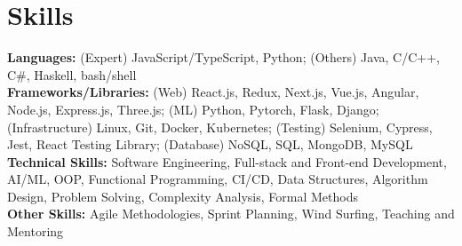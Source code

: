\documentclass[letterpaper,11pt]{article}
\begin{document}
\section{Skills}
 \begin{itemize}[leftmargin=0.15in, label={}]
    \small{
    \item
    \textbf{Languages: }{(Expert) JavaScript/TypeScript, Python; (Others) Java, C/C++, C\#, Haskell, bash/shell}\\
    \textbf{Frameworks/Libraries: }{(Web) React.js, Redux, Next.js, Vue.js, Angular, Node.js, Express.js, Three.js; (ML) Python, Pytorch, Flask, Django; (Infrastructure) Linux, Git, Docker, Kubernetes; (Testing) Selenium, Cypress, Jest, React Testing Library; (Database) NoSQL, SQL, MongoDB, MySQL}\\
    \textbf{Technical Skills: }{Software Engineering, Full-stack and Front-end Development, AI/ML, OOP, Functional Programming, CI/CD, Data Structures, Algorithm Design, Problem Solving, Complexity Analysis, Formal Methods}\\
    \textbf{Other Skills: }{Agile Methodologies, Sprint Planning, Wind Surfing, Teaching and Mentoring}    
    }
 \end{itemize}


\end{document}
